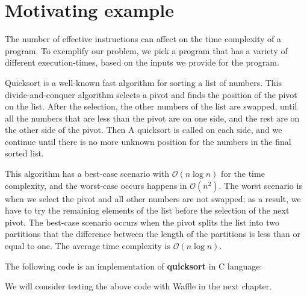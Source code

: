 \section{Motivating example}
\label{sec:3-motive}

The number of effective instructions can affect on the time complexity of a program. To exemplify our problem, we pick a program that has a variety of different execution-times, based on the inputs we provide for the program. 

Quicksort \cite{hoare1962quicksort} is a well-known fast algorithm for sorting a list of numbers. This divide-and-conquer algorithm selects a pivot and finds the position of the pivot on the list. After the selection, the other numbers of the list are swapped, until all the numbers that are less than the pivot are on one side, and the rest are on the other side of the pivot. Then A quicksort is called on each side, and we continue until there is no more unknown position for the numbers in the final sorted list.

This algorithm has a best-case scenario with $\mathcal{O}(n\log{}n)$ for the time complexity, and the worst-case occurs happens in $\mathcal{O}(n^2)$. The worst scenario is when we select the pivot and all other numbers are not swapped; as a result, we have to try the remaining elements of the list before the selection of the next pivot. The best-case scenario occurs when the pivot splits the list into two partitions that the difference between the length of the partitions is less than or equal to one. The average time complexity is $\mathcal{O}(n\log{}n)$.

The following code is an implementation of \textbf{quicksort} in C language:



We will consider testing the above code with Waffle in the next chapter.
